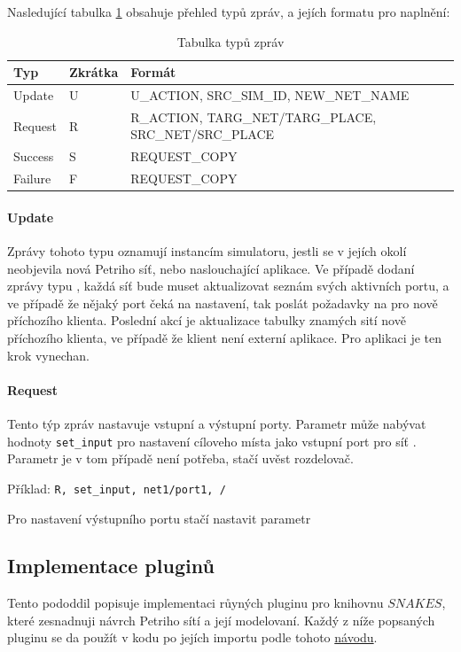 Nasledující tabulka \ref{tab:mqtt-msg-types} obsahuje přehled typů zpráv, a jejích formatu pro naplnění:

\begin{table}[H]
	\vskip6pt
	\caption{Tabulka typů zpráv}
    \vskip6pt
	\centering
	\begin{tabular}{llllr}
		\toprule
		Typ & Zkrátka & Formát \\
    \midrule
    Update & U & U\_ACTION, SRC\_SIM\_ID, NEW\_NET\_NAME \\
    Request & R & R\_ACTION, TARG\_NET/TARG\_PLACE, SRC\_NET/SRC\_PLACE \\
    Success & S & REQUEST\_COPY \\
    Failure & F & REQUEST\_COPY \\
		\bottomrule
	\end{tabular}
	\label{tab:mqtt-msg-types}
\end{table}

\paragraph{Update} Zprávy tohoto typu oznamují instancím simulatoru, jestli se v jejích okolí neobjevila nová Petriho síť, nebo naslouchající aplikace. Ve případě dodaní zprávy typu , každá síť bude muset aktualizovat seznám svých aktivních portu, a ve případě že nějaký port čeká na nastavení, tak poslát požadavky na pro nově příchozího klienta. Poslední akcí je aktualizace tabulky znamých sití nově příchozího klienta, ve případě že klient není externí aplikace. Pro aplikaci je ten krok vynechan.

\paragraph{Request} Tento týp zpráv nastavuje vstupní a výstupní porty. Parametr  může nabývat hodnoty \texttt{set\_input} pro nastavení cíloveho místa  jako vstupní port pro síť . Parametr  je v tom případě není potřeba, stačí uvěst rozdelovač.

Příklad: \texttt{R, set\_input, net1/port1, /}

Pro nastavení výstupního portu stačí nastavit parametr

\subsection{Implementace pluginů}
\label{sec:plug-impl}
Tento pododdil popisuje implementaci růyných pluginu pro knihovnu $SNAKES$, které zesnadnuji návrch Petriho sítí a její modelovaní. Každý z níže popsaných pluginu se da  použít v kodu po jejích importu podle tohoto \href{https://www.ibisc.univ-evry.fr/~fpommereau/SNAKES/first-steps-with-snakes.html}{návodu}.

